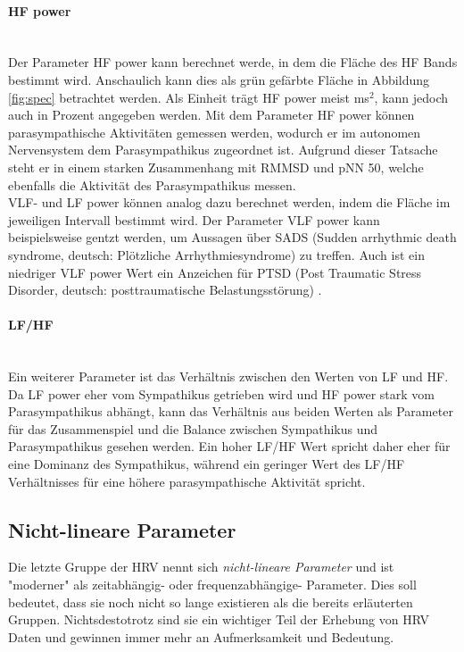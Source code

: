  \paragraph{HF power}\mbox{} \\
 Der Parameter HF power kann berechnet werde, in dem die Fläche des HF Bands bestimmt wird. Anschaulich kann dies als grün gefärbte Fläche in Abbildung \ref{fig:spec} betrachtet werden. Als Einheit trägt HF power meist ms$^{2}$, kann jedoch auch in Prozent angegeben werden. 
 Mit dem Parameter HF power können parasympathische Aktivitäten gemessen werden, wodurch er im autonomen Nervensystem dem Parasympathikus zugeordnet ist. Aufgrund dieser Tatsache steht er in einem starken Zusammenhang mit RMMSD und pNN 50, welche ebenfalls die Aktivität des Parasympathikus messen. \\
 VLF- und LF power können analog dazu berechnet werden, indem die Fläche im jeweiligen Intervall bestimmt wird. Der Parameter VLF power kann beispielsweise gentzt werden, um Aussagen über SADS (Sudden arrhythmic death syndrome, deutsch: Plötzliche Arrhythmiesyndrome) zu treffen. Auch ist ein niedriger VLF power Wert ein Anzeichen für PTSD (Post Traumatic Stress Disorder, deutsch: posttraumatische Belastungsstörung) . \cite[S.5]{med}
 
 \paragraph{LF/HF}\mbox{} \\
 Ein weiterer Parameter ist das Verhältnis zwischen den Werten von LF und HF. Da LF power eher vom Sympathikus getrieben wird und HF power stark vom Parasympathikus abhängt, kann das Verhältnis aus beiden Werten als Parameter für das Zusammenspiel und die Balance zwischen Sympathikus und Parasympathikus gesehen werden. Ein hoher LF/HF Wert spricht daher eher für eine Dominanz des Sympathikus, während ein geringer Wert des LF/HF Verhältnisses für eine höhere parasympathische Aktivität spricht. \cite[S.5]{med} 
 
 \subsection{Nicht-lineare Parameter}
 
 Die letzte Gruppe der HRV nennt sich \textit{nicht-lineare Parameter} und ist "moderner" als zeitabhängig- oder frequenzabhängige- Parameter. Dies soll bedeutet, dass sie noch nicht so lange existieren als die bereits erläuterten Gruppen. Nichtsdestotrotz sind sie ein wichtiger Teil der Erhebung von HRV Daten und gewinnen immer mehr an Aufmerksamkeit und Bedeutung.\\
 
